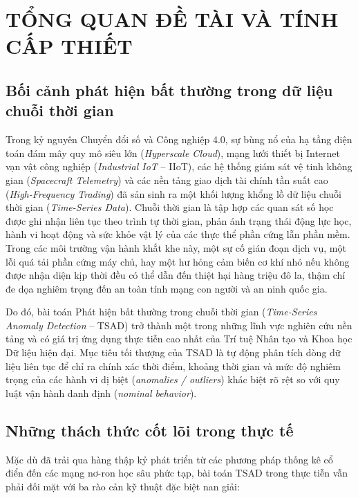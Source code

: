 \documentclass[11pt,journal,onecolumn]{IEEEtran}
\begin{document}
\section{TỔNG QUAN ĐỀ TÀI VÀ TÍNH CẤP THIẾT}
\label{sec:chapter1}

\subsection{Bối cảnh phát hiện bất thường trong dữ liệu chuỗi thời gian}
Trong kỷ nguyên Chuyển đổi số và Công nghiệp 4.0, sự bùng nổ của hạ tầng điện toán đám mây quy mô siêu lớn (\textit{Hyperscale Cloud}), mạng lưới thiết bị Internet vạn vật công nghiệp (\textit{Industrial IoT} -- IIoT), các hệ thống giám sát vệ tinh không gian (\textit{Spacecraft Telemetry}) và các nền tảng giao dịch tài chính tần suất cao (\textit{High-Frequency Trading}) đã sản sinh ra một khối lượng khổng lồ dữ liệu chuỗi thời gian (\textit{Time-Series Data}). Chuỗi thời gian là tập hợp các quan sát số học được ghi nhận liên tục theo trình tự thời gian, phản ánh trạng thái động lực học, hành vi hoạt động và sức khỏe vật lý của các thực thể phần cứng lẫn phần mềm. Trong các môi trường vận hành khắt khe này, một sự cố gián đoạn dịch vụ, một lỗi quá tải phần cứng máy chủ, hay một hư hỏng cảm biến cơ khí nhỏ nếu không được nhận diện kịp thời đều có thể dẫn đến thiệt hại hàng triệu đô la, thậm chí đe dọa nghiêm trọng đến an toàn tính mạng con người và an ninh quốc gia.

Do đó, bài toán Phát hiện bất thường trong chuỗi thời gian (\textit{Time-Series Anomaly Detection} -- TSAD) trở thành một trong những lĩnh vực nghiên cứu nền tảng và có giá trị ứng dụng thực tiễn cao nhất của Trí tuệ Nhân tạo và Khoa học Dữ liệu hiện đại. Mục tiêu tối thượng của TSAD là tự động phân tích dòng dữ liệu liên tục để chỉ ra chính xác thời điểm, khoảng thời gian và mức độ nghiêm trọng của các hành vi dị biệt (\textit{anomalies / outliers}) khác biệt rõ rệt so với quy luật vận hành danh định (\textit{nominal behavior}).

\subsection{Những thách thức cốt lõi trong thực tế}
Mặc dù đã trải qua hàng thập kỷ phát triển từ các phương pháp thống kê cổ điển đến các mạng nơ-ron học sâu phức tạp, bài toán TSAD trong thực tiễn vẫn phải đối mặt với ba rào cản kỹ thuật đặc biệt nan giải:
\end{document}
